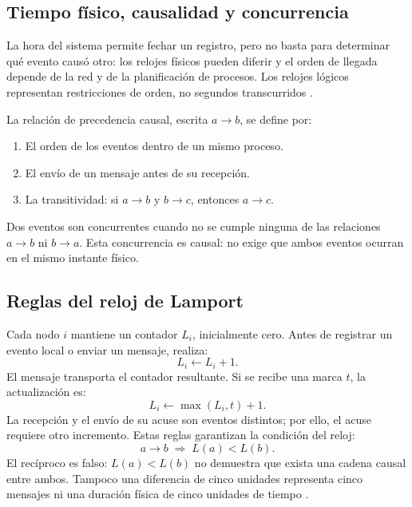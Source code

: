 \subsection{Tiempo físico, causalidad y concurrencia}
La hora del sistema permite fechar un registro, pero no basta para determinar
qué evento causó otro: los relojes físicos pueden diferir y el orden de llegada
depende de la red y de la planificación de procesos. Los relojes lógicos
representan restricciones de orden, no segundos transcurridos
\cite{vanSteenTanenbaum2023}.

La relación de precedencia causal, escrita $a\rightarrow b$, se define por:
\begin{enumerate}
  \item El orden de los eventos dentro de un mismo proceso.
  \item El envío de un mensaje antes de su recepción.
  \item La transitividad: si $a\rightarrow b$ y $b\rightarrow c$, entonces
  $a\rightarrow c$.
\end{enumerate}
Dos eventos son concurrentes cuando no se cumple ninguna de las relaciones
$a\rightarrow b$ ni $b\rightarrow a$. Esta concurrencia es causal: no exige
que ambos eventos ocurran en el mismo instante físico.

\subsection{Reglas del reloj de Lamport}
Cada nodo $i$ mantiene un contador $L_i$, inicialmente cero. Antes de registrar
un evento local o enviar un mensaje, realiza:
\begin{equation}
L_i \leftarrow L_i+1.
\label{eq:lamport-envio}
\end{equation}
El mensaje transporta el contador resultante. Si se recibe una marca $t$, la
actualización es:
\begin{equation}
L_i \leftarrow \max(L_i,t)+1.
\label{eq:lamport-recepcion}
\end{equation}
La recepción y el envío de su acuse son eventos distintos; por ello, el acuse
requiere otro incremento. Estas reglas garantizan la condición del reloj:
\begin{equation}
a\rightarrow b \;\Longrightarrow\; L(a)<L(b).
\end{equation}
El recíproco es falso: $L(a)<L(b)$ no demuestra que exista una cadena causal
entre ambos. Tampoco una diferencia de cinco unidades representa cinco
mensajes ni una duración física de cinco unidades de tiempo
\cite{vanSteenTanenbaum2023}.

